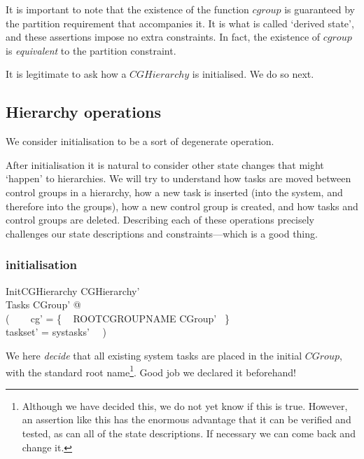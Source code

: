 \documentclass[a4paper,twoside,12pt]{article}
\begin{document}
It is important to note that the existence of the function $cgroup$ is guaranteed by the partition requirement that accompanies it. It is what is called `derived state', and these assertions impose no extra constraints. In fact, the existence of $cgroup$ is \emph{equivalent} to the partition constraint.

It is legitimate to ask how a $CGHierarchy$ is initialised. We do so next.


\subsection{Hierarchy operations}

We consider initialisation to be a sort of degenerate operation.

After initialisation it is natural to consider other state changes that might `happen' to hierarchies. We will try to understand how tasks are moved between control groups in a hierarchy, how a new task is inserted (into the system, and therefore into the groups), how a new control group is created, and how tasks and control groups are deleted. Describing each of these operations precisely challenges our state descriptions and constraints---which is a good thing.

\subsubsection*{initialisation}

\begin{schema}{InitCGHierarchy}
CGHierarchy' \\
\Xi Tasks
\where
\exists CGroup' @ \\
( ~~~ cg' = \{ ~ ROOTCGROUPNAME \mapsto \theta CGroup' ~\} \\
\land taskset' = systasks' ~~)
\end{schema}
We here \emph{decide} that all existing system tasks are placed in the initial $CGroup$, 
with the standard root name\footnote{Although we have decided this, 
we do not yet know if this is true. However, an assertion like this has the enormous advantage that it can be verified 
and tested, as can all of the state descriptions. If necessary we can come back and change it.}. 
Good job we declared it beforehand!

\end{document}
